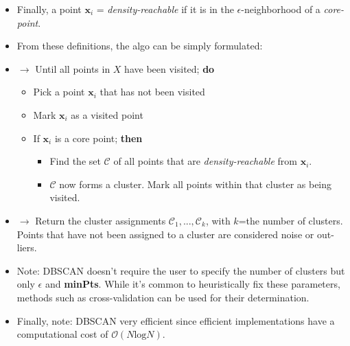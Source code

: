 \documentclass[norsk,a4paper,11pt]{article}
\begin{document}
\begin{itemize}
\begin{itemize}
		\item Finally, a point $\bm{x}_i$ = \textit{density-reachable} if it is in the $\epsilon$-neighborhood of a \textit{core-point}. 
		\item From these definitions, the algo can be simply formulated:
		\item $\rightarrow$ Until all points in $X$ have been visited; \textbf{do}
		\begin{itemize}
			\item Pick a point $\bm{x}_i$ that has not been visited
			\item Mark $\bm{x}_i$  as a visited point
			\item If $\bm{x}_i$ is a core point; \textbf{then}
			\begin{itemize}
				\item Find the set $\mathcal{C}$ of all points that are \textit{density-reachable} from $\bm{x}_i$.
				\item $\mathcal{C}$ now forms a cluster. Mark all points within that cluster as being visited.
			\end{itemize}
		\end{itemize}
		\item $\rightarrow$ Return the cluster assignments $\mathcal{C}_1,...,\mathcal{C}_k$, with $k$=the number of clusters. Points that have not been assigned to a cluster are considered noise or out-liers.
		\item Note: DBSCAN doesn't require the user to specify the number of clusters but only $\epsilon$ and \textbf{minPts}. While it's common to heuristically fix these parameters, methods such as cross-validation can be used for their determination. 
		\item Finally, note: DBSCAN very efficient since efficient implementations have a computational cost of $\mathcal{O} (N\text{log}N)$.
	\end{itemize}
\end{itemize}
\end{document}
